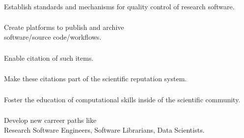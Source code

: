 \documentclass{beamer}
\begin{document}
\begin{frame}
  \frametitle{}
  \begin{block}{}
    \begin{center}
      Establish standards and mechanisms for quality control of
      research software.
    \end{center}
  \end{block}
\end{frame}

\begin{frame}
  \frametitle{}
  \begin{block}{}
    \begin{center}
      Create platforms to publish and archive\\software/source
      code/workflows.
    \end{center}
  \end{block}
\end{frame}

\begin{frame}
  \frametitle{}
  \begin{block}{}
    \begin{center}
      Enable citation of such items.
    \end{center}
  \end{block}
\end{frame}

\begin{frame}
  \frametitle{}
  \begin{block}{}
    \begin{center}
      Make these citations part of the scientific reputation system.
    \end{center}
  \end{block}
\end{frame}

\begin{frame}
  \frametitle{}
  \begin{block}{}
    \begin{center}
      Foster the education of computational skills inside of the
      scientific community.
    \end{center}
  \end{block}
\end{frame}

\begin{frame}
  \frametitle{}
  \begin{block}{}
    \begin{center}
      Develop new carreer paths like\\ Research Software Engineers,
      Software Librarians, Data Scientists.
    \end{center}
  \end{block}
\end{frame}
\end{document}
